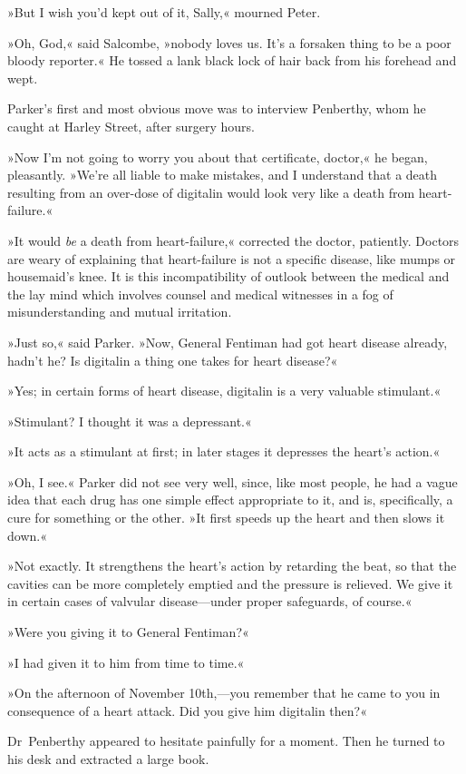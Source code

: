 »But I wish you'd kept out of it, Sally,« mourned Peter.

»Oh, God,« said Salcombe, »nobody loves us. It's a forsaken thing to be a poor bloody reporter.« He tossed a lank black lock of hair back from his forehead and wept.

Parker's first and most obvious move was to interview Penberthy, whom he caught at Harley Street, after surgery hours.

»Now I'm not going to worry you about that certificate, doctor,« he began, pleasantly. »We're all liable to make mistakes, and I understand that a death resulting from an over-dose of digitalin would look very like a death from heart-failure.«

»It would \textit{be} a death from heart-failure,« corrected the doctor, patiently. Doctors are weary of explaining that heart-failure is not a specific disease, like mumps or housemaid's knee. It is this incompatibility of outlook between the medical and the lay mind which involves counsel and medical witnesses in a fog of misunderstanding and mutual irritation.

»Just so,« said Parker. »Now, General Fentiman had got heart disease already, hadn't he? Is digitalin a thing one takes for heart disease?«

»Yes; in certain forms of heart disease, digitalin is a very valuable stimulant.«

»Stimulant? I thought it was a depressant.«

»It acts as a stimulant at first; in later stages it depresses the heart's action.«

»Oh, I see.« Parker did not see very well, since, like most people, he had a vague idea that each drug has one simple effect appropriate to it, and is, specifically, a cure for something or the other. »It first speeds up the heart and then slows it down.«

»Not exactly. It strengthens the heart's action by retarding the beat, so that the cavities can be more completely emptied and the pressure is relieved. We give it in certain cases of valvular disease—under proper safeguards, of course.«

»Were you giving it to General Fentiman?«

»I had given it to him from time to time.«

»On the afternoon of November 10th,—you remember that he came to you in consequence of a heart attack. Did you give him digitalin then?«

Dr~Penberthy appeared to hesitate painfully for a moment. Then he turned to his desk and extracted a large book.

